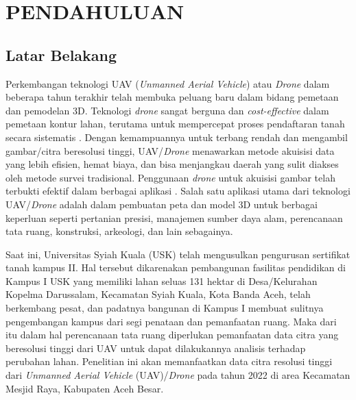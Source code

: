 
\chapter{PENDAHULUAN}

\section{Latar Belakang}

\par Perkembangan teknologi UAV (\textit{Unmanned Aerial Vehicle}) atau \textit{Drone} dalam
beberapa tahun terakhir telah membuka peluang baru dalam bidang pemetaan dan pemodelan 3D. Teknologi \textit{drone} sangat berguna dan \textit{cost-effective} dalam pemetaan kontur lahan, terutama untuk mempercepat proses pendaftaran tanah secara sistematis \citep{stefano2020pemanfaatan}. Dengan kemampuannya untuk terbang rendah dan mengambil gambar/citra beresolusi tinggi, UAV/\textit{Drone} menawarkan metode akuisisi data yang lebih efisien, hemat biaya, dan bisa menjangkau daerah yang sulit diakses oleh metode survei tradisional. Penggunaan \textit{drone} untuk akuisisi gambar telah terbukti efektif dalam berbagai aplikasi \citep{suryan2022analisa}. Salah satu aplikasi utama dari teknologi UAV/\textit{Drone} adalah dalam pembuatan peta dan model 3D untuk berbagai keperluan seperti pertanian presisi, manajemen sumber daya alam, perencanaan tata ruang, konstruksi, arkeologi, dan lain sebagainya.

Saat ini, Universitas Syiah Kuala (USK) telah mengusulkan pengurusan sertifikat tanah kampus II. Hal tersebut dikarenakan pembangunan fasilitas pendidikan di Kampus I USK yang memiliki lahan seluas 131 hektar di Desa/Kelurahan Kopelma Darussalam, Kecamatan Syiah Kuala, Kota Banda Aceh, telah berkembang pesat, dan padatnya bangunan di Kampus I membuat sulitnya pengembangan kampus dari segi penataan dan pemanfaatan ruang. Maka dari itu dalam hal perencanaan tata ruang diperlukan pemanfaatan data citra yang beresolusi tinggi dari UAV untuk dapat dilakukannya analisis terhadap perubahan lahan. Penelitian ini akan memanfaatkan data citra resolusi tinggi dari \textit{Unmanned Aerial Vehicle} (UAV)/\textit{Drone} pada tahun 2022 di area Kecamatan Mesjid Raya, Kabupaten Aceh Besar. 

